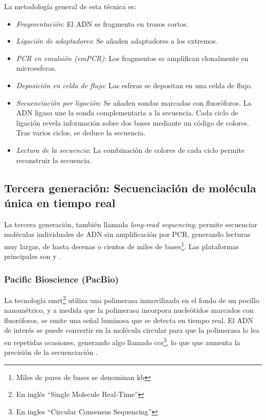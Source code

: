 \documentclass{AsignaturaResumen}
\begin{document}
La metodología general de esta técnica es:

\begin{itemize}
    \item \emph{Fragmentación}: El ADN se fragmenta en trozos cortos.
    \item \emph{Ligación de adaptadores}: Se añaden adaptadores a los extremos.
    \item \emph{PCR en emulsión (emPCR)}: Los fragmentos se amplifican clonalmente en microesferas.
    \item \emph{Deposición en celda de flujo}: Las esferas se depositan en una celda de flujo.
    \item \emph{Secuenciación por ligación}: Se añaden sondas marcadas con fluoróforos. La ADN ligasa une la sonda complementaria a la secuencia. Cada ciclo de ligación revela información sobre dos bases mediante un código de colores. Tras varios ciclos, se deduce la secuencia.
    \item \emph{Lectura de la secuencia}: La combinación de colores de cada ciclo permite reconstruir la secuencia.
\end{itemize}

    



\FloatBarrier
\subsection[Tercera generación]{Tercera generación: Secuenciación de molécula única en tiempo real}

La tercera generación, también llamada \textit{long-read sequencing}, permite secuenciar moléculas individuales de ADN sin amplificación por PCR, generando lecturas muy largas, de hasta decenas o cientos de miles de bases\footnote{Miles de pares de bases se denominan \acrfull{kb}}. Las plataformas principales son  y  \citep{erenDNASequencingMethods2022}.


\FloatBarrier
\subsubsection{Pacific Bioscience (PacBio)}\label{sec:pacific}

La tecnología \acrfull{smrt}\footnote{En inglés ``Single Molecule Real-Time''} utiliza una polimerasa inmovilizada en el fondo de un pocillo nanométrico, y a medida que la polimerasa incorpora nucleótidos marcados con fluoróforos, se emite una señal luminosa que se detecta en tiempo real. El ADN de interés se puede  convertir en la molécula circular para que la polimerasa lo lea en repetidas ocasiones, generando algo llamado \acrfull{ccs}\footnote{En ingles ``Circular Consensus Sequencing''}, lo que que aumenta la precisión de la secuenciación \citep{erenDNASequencingMethods2022}.
\end{document}
